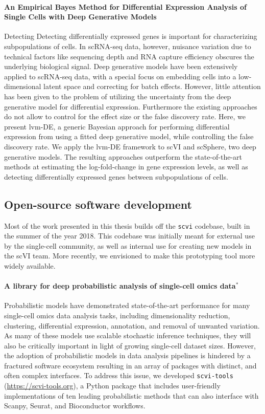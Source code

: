 \paragraph{An Empirical Bayes Method for Differential Expression Analysis of Single Cells with Deep Generative Models} Detecting Detecting differentially expressed genes is important for characterizing subpopulations of cells. In scRNA-seq data, however, nuisance variation due to technical factors like sequencing depth and RNA capture efficiency obscures the underlying biological signal. Deep generative models have been extensively applied to scRNA-seq data, with a special focus on embedding cells into a low-dimensional latent space and correcting for batch effects. However, little attention has been given to the problem of utilizing the uncertainty from the deep generative model for differential expression. Furthermore the existing approaches do not allow to control for the effect size or the false discovery rate. Here, we present lvm-DE, a generic Bayesian approach for performing differential expression from using a fitted deep generative model, while controlling the false discovery rate. We apply the lvm-DE framework to scVI and scSphere, two deep generative models. The resulting approaches outperform the state-of-the-art methods at estimating the log-fold-change in gene expression levels, as well as detecting differentially expressed genes between subpopulations of cells.

\subsection{Open-source software development}

Most of the work presented in this thesis builds off the \texttt{scvi} codebase, built in the summer of the year 2018. This codebase was initially meant for external use by the single-cell community, as well as internal use for creating new models in the scVI team. More recently, we envisioned to make this prototyping tool more widely available. 

\paragraph{A library for deep probabilistic analysis of single-cell omics data$^*$}

Probabilistic models have demonstrated state-of-the-art performance for many single-cell omics data analysis tasks, including dimensionality reduction, clustering, differential expression, annotation, and removal of unwanted variation.
As many of these models use scalable stochastic inference techniques, they will also be critically important in light of growing single-cell dataset sizes.
However, the adoption of probabilistic models in data analysis pipelines is hindered by a fractured software ecosystem resulting in an array of packages with distinct, and often complex interfaces.
To address this issue, we developed \texttt{scvi-tools} (\url{https://scvi-tools.org}), a Python package that includes user-friendly implementations of ten leading probabilistic methods that can also interface with Scanpy, Seurat, and Bioconductor workflows. 

